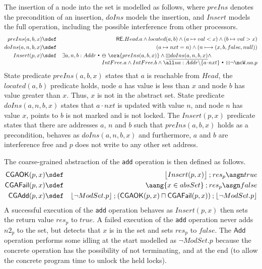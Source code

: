 \documentclass{article}
\def\cdota{\!\cdot\!}
\def \reachable{{\sf RE}}
\newcommand{\AG}[1]{\aang{#1}}
\newcommand{\st}{~{\scriptscriptstyle ^\bullet}~}
\theoremstyle{plain}
\theoremstyle{definition}
\newcommand{\prev}{\varominus}
\newcommand{\Always}{\textstyle\mathord{\boxdot}}
\def\ch{\mathbin{;}}
\def \bs {\backslash}
\begin{document}
The insertion of a node into the set is modelled as follows, where
$preIns$ denotes the precondition of an insertion, $doIns$ models the
insertion, and $Insert$ models the full operation, including the
possible interference from other processors. 
\begin{eqnarray*}
preIns(a, b, x) & \sdef & \reachable.Head.a \land located(a,b) \land (a \mapsto val <
  x) \land (b \mapsto val > x)
\\
doIns(a, n, b, x) & \sdef & (a \mapsto nxt = n) \land (n \longmapsto (x,
b, false, null))
\\
Insert(p, x) & \sdef &
\exists a, n, b : Addr \st
\begin{array}[t]{@{}l@{}}
\prev\ \ora{preIns(a,b,x)} \land  \NE{\Always doIns(a,n,b,x)}\land\\
IntFree.a \land IntFree.b \land 
 \all ua : Addr \bs \{a\cdota nxt\} \st \Always \neg \mcW.ua.p  
\end{array}
\end{eqnarray*}
State predicate $preIns(a, b, x)$ states that $a$ is reachable from
$Head$, the $located(a,b)$ predicate holds, node $a$ has value is less
than $x$ and node $b$ has value greater than $x$. Thus, $x$ is not in
the abstract set. State predicate $doIns(a, n, b, x)$ states that $a
\cdot nxt$ is updated with value $n$, and node $n$ has value $x$,
points to $b$ is not marked and is not locked. The $Insert(p, x)$
predicate states that there are addresses $a$, $n$ and $b$ such that
$preIns(a,b,x)$ holds as a precondition, behaves as $doIns(a,n,b,x)$
and furthermore, $a$ and $b$ are interference free and $p$ does not
write to any other set address.

The coarse-grained abstraction of the \texttt{add} operation is then
defined as follows.
\begin{eqnarray*}
  \mathsf{CGAOK}(p, x) & \sdef &
  \begin{array}[t]{@{}l@{}}
\spec{
\begin{array}[c]{@{}l@{}}
         Insert(p, x)\end{array}
} \ch 
  res_p \asgn true 
\end{array}
  \\
\mathsf{CGAFail}(p, x) & \sdef & \AG{x \in absSet} \ch 
    res_p \asgn false
  \\
  \mathsf{CGAdd}(p, x) & \sdef &  \spec{\neg ModSet.p} \ch 
  (\mathsf{CGAOK}(p, x) \sqcap \mathsf{CGAFail}(p, x)) \ch \spec{\neg ModSet.p}
\end{eqnarray*}
A successful execution of the \texttt{add} operation behaves as
$Insert(p,x)$ then sets the return value $res_p$ to $true$. A failed
execution of the \texttt{add} operation never adds $n2_p$ to the set,
but detects that $x$ is in the set and sets $res_p$ to $false$. The
$\mathsf{Add}$ operation performs some idling at the start modelled as
$\neg ModSet.p$ because the concrete operation has the possibility of
not terminating, and at the end (to allow the concrete program time to
unlock the held locks).
\end{document}
